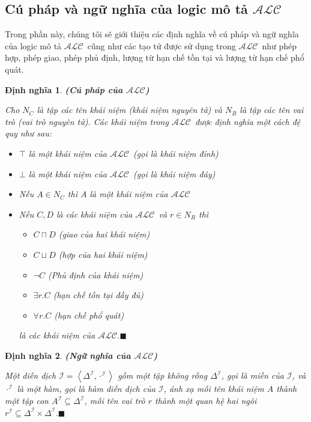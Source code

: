 \documentclass[12pt,a4paper]{report}
\newtheorem{Definition}{Định nghĩa}[chapter]
\newcommand{\myend}{\mbox{}\hfill\mbox{{\scriptsize$\!\blacksquare$}}}
\newcommand{\mand}{\sqcap}
\newcommand{\mor}{\sqcup}
\newcommand{\V}{\forall}
\newcommand{\E}{\exists}
\newcommand{\ALC}{$\mathcal{ALC}$}
\newcommand{\mI}{\mathcal{I}}
\def\tuple#1{\left\langle#1\right\rangle}
\begin{document}
\subsection{Cú pháp và ngữ nghĩa của logic mô tả \ALC}\label{subsec:SyntaxSemantic}
Trong phần này, chúng tôi sẽ giới thiệu các định nghĩa về cú pháp và ngữ nghĩa của logic mô tả \ALC\ cũng như các tạo tử được sử dụng trong \ALC\ như phép hợp, phép giao, phép phủ định, lượng từ hạn chế tồn tại và lượng từ hạn chế phổ quát.
\begin{Definition}\label{def:SyntaxALC}
\textbf{(Cú pháp của \ALC)}

Cho $N_C$ là tập các tên khái niệm (khái niệm nguyên tử) và $N_R$ là tập các tên vai trò (vai trò nguyên tử). Các khái niệm trong \ALC\ được định nghĩa một cách đệ quy như sau:

\begin{itemize}
  \item $\top$ là một khái niệm của \ALC\ (gọi là khái niệm đỉnh)
  \item $\bot$ là một khái niệm của \ALC\ (gọi là khái niệm đáy)
  \item Nếu $A \in N_C$ thì $A$ là một khái niệm của \ALC
  \item Nếu $C, D$ là các khái niệm của \ALC\ và $r \in N_R$ thì
  \begin{itemize}
    \item $C \mand D$ (giao của hai khái niệm)
    \item $C \mor D$ (hợp của hai khái niệm)
    \item $\neg C$ (Phủ định của khái niệm)
    \item $\E r.C$ (hạn chế tồn tại đầy đủ)
    \item $\V r.C$ (hạn chế phổ quát)
  \end{itemize}
  là các khái niệm của \ALC.\myend
\end{itemize}
\end{Definition}
\begin{Definition}\label{def:SemanticALC}
\textbf{(Ngữ nghĩa của \ALC)}

Một diễn dịch $\mI = \tuple{\Delta^\mI, \cdot^\mI}$ gồm một tập không rỗng $\Delta^\mI$, gọi là \textnormal{miền} của $\mI$, và $\cdot^\mI$ là một hàm, gọi là \textnormal{hàm diễn dịch} của $\mI$, ánh xạ mỗi tên khái niệm $A$ thành một tập con $A^\mI \subseteq \Delta^\mI$, mỗi tên vai trò $r$ thành một quan hệ hai ngôi $r^\mI \subseteq \Delta^\mI \times \Delta^\mI$.\myend
\end{Definition}
\end{document}
